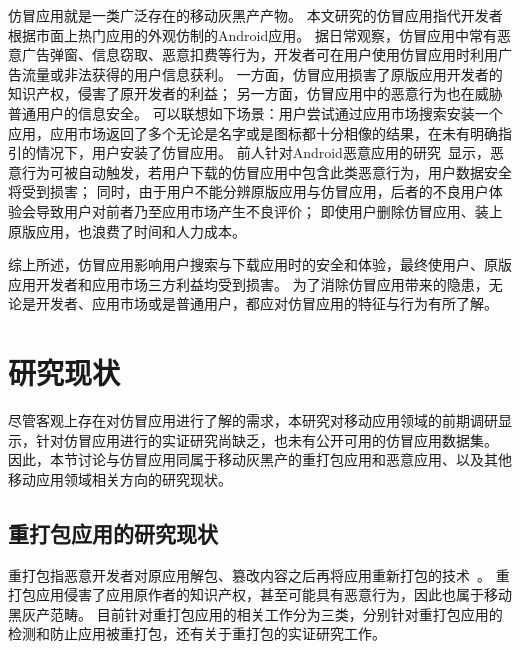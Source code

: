 仿冒应用就是一类广泛存在的移动灰黑产产物。
本文研究的仿冒应用指代开发者根据市面上热门应用的外观仿制的Android应用。
据日常观察，仿冒应用中常有恶意广告弹窗、信息窃取、恶意扣费等行为，开发者可在用户使用仿冒应用时利用广告流量或非法获得的用户信息获利。
一方面，仿冒应用损害了原版应用开发者的知识产权，侵害了原开发者的利益；
另一方面，仿冒应用中的恶意行为也在威胁普通用户的信息安全。
可以联想如下场景：用户尝试通过应用市场搜索安装一个应用，应用市场返回了多个无论是名字或是图标都十分相像的结果，在未有明确指引的情况下，用户安装了仿冒应用。
前人针对Android恶意应用的研究~\cite{Zhou2012DissectingAM}显示，恶意行为可被自动触发，若用户下载的仿冒应用中包含此类恶意行为，用户数据安全将受到损害；
同时，由于用户不能分辨原版应用与仿冒应用，后者的不良用户体验会导致用户对前者乃至应用市场产生不良评价；
即使用户删除仿冒应用、装上原版应用，也浪费了时间和人力成本。

综上所述，仿冒应用影响用户搜索与下载应用时的安全和体验，最终使用户、原版应用开发者和应用市场三方利益均受到损害。
为了消除仿冒应用带来的隐患，无论是开发者、应用市场或是普通用户，都应对仿冒应用的特征与行为有所了解。

\section{研究现状}
尽管客观上存在对仿冒应用进行了解的需求，本研究对移动应用领域的前期调研显示，针对仿冒应用进行的实证研究尚缺乏，也未有公开可用的仿冒应用数据集。
因此，本节讨论与仿冒应用同属于移动灰黑产的重打包应用和恶意应用、以及其他移动应用领域相关方向的研究现状。

\subsection{重打包应用的研究现状}
\label{sec:repackaging}
重打包指恶意开发者对原应用解包、篡改内容之后再将应用重新打包的技术~\cite{khanmohammadi2019empirical}。
重打包应用侵害了应用原作者的知识产权，甚至可能具有恶意行为，因此也属于移动黑灰产范畴。
目前针对重打包应用的相关工作分为三类，分别针对重打包应用的检测和防止应用被重打包，还有关于重打包的实证研究工作。


